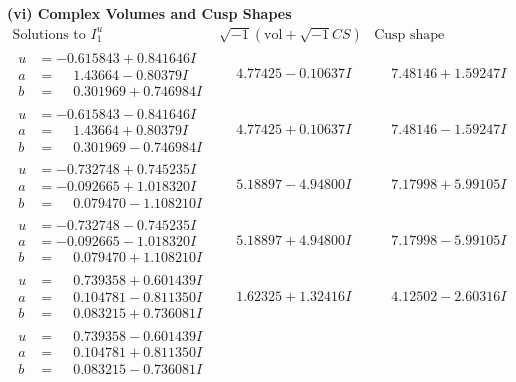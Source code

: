 \documentclass[1p]{elsarticle_modified}
\theoremstyle{definition}
\newcommand{\I}{\sqrt{-1}}
\begin{document}
\newpage\flushleft \textbf{(vi) Complex Volumes and Cusp Shapes}
$$\begin{array}{c|c|c}  
\text{Solutions to }I^u_{1}& \I (\text{vol} + \sqrt{-1}CS) & \text{Cusp shape}\\
 \hline 
\begin{aligned}
u &= -0.615843 + 0.841646 I \\
a &= \phantom{-}1.43664 - 0.80379 I \\
b &= \phantom{-}0.301969 + 0.746984 I\end{aligned}
 & \phantom{-}4.77425 - 0.10637 I & \phantom{-}7.48146 + 1.59247 I \\ \hline\begin{aligned}
u &= -0.615843 - 0.841646 I \\
a &= \phantom{-}1.43664 + 0.80379 I \\
b &= \phantom{-}0.301969 - 0.746984 I\end{aligned}
 & \phantom{-}4.77425 + 0.10637 I & \phantom{-}7.48146 - 1.59247 I \\ \hline\begin{aligned}
u &= -0.732748 + 0.745235 I \\
a &= -0.092665 + 1.018320 I \\
b &= \phantom{-}0.079470 - 1.108210 I\end{aligned}
 & \phantom{-}5.18897 - 4.94800 I & \phantom{-}7.17998 + 5.99105 I \\ \hline\begin{aligned}
u &= -0.732748 - 0.745235 I \\
a &= -0.092665 - 1.018320 I \\
b &= \phantom{-}0.079470 + 1.108210 I\end{aligned}
 & \phantom{-}5.18897 + 4.94800 I & \phantom{-}7.17998 - 5.99105 I \\ \hline\begin{aligned}
u &= \phantom{-}0.739358 + 0.601439 I \\
a &= \phantom{-}0.104781 - 0.811350 I \\
b &= \phantom{-}0.083215 + 0.736081 I\end{aligned}
 & \phantom{-}1.62325 + 1.32416 I & \phantom{-}4.12502 - 2.60316 I \\ \hline\begin{aligned}
u &= \phantom{-}0.739358 - 0.601439 I \\
a &= \phantom{-}0.104781 + 0.811350 I \\
b &= \phantom{-}0.083215 - 0.736081 I\end{aligned}

\end{array}$$
\end{document}
